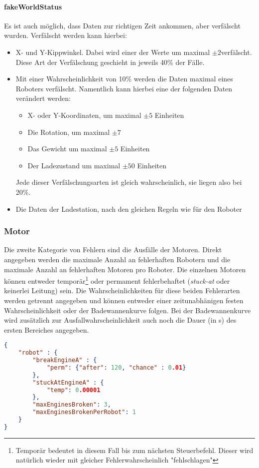\paragraph{fakeWorldStatus} Es ist auch m{\"{o}}glich, dass Daten zur richtigen Zeit ankommen, aber
    verf{\"{a}}lscht wurden. Verf{\"{a}}lscht werden kann hierbei:
	\begin{itemize}
		\item X- und Y-Kippwinkel. Dabei wird einer der Werte um maximal $\pm 2$\textdegree verf{\"{a}}lscht.
			Diese Art der Verf{\"{a}}lschung geschieht in jeweils 40\% der F{\"{a}}lle.
		\item Mit einer Wahrscheinlichkeit von 10\% werden die Daten maximal eines Roboters verf{\"{a}}lscht.
			Namentlich kann hierbei eine der folgenden Daten ver{\"{a}}ndert werden:
			\begin{itemize}
				\item X- oder Y-Koordinaten, um maximal $\pm 5$ Einheiten
				\item Die Rotation, um maximal $\pm 7$\textdegree
				\item Das Gewicht um maximal $\pm 5$ Einheiten
				\item Der Ladezustand um maximal $\pm 50$ Einheiten
			\end{itemize}
			Jede dieser Verf{\"{a}}lschungsarten ist gleich wahrscheinlich, sie liegen also bei 20\%.
		\item Die Daten der Ladestation, nach den gleichen Regeln wie f{\"{u}}r den Roboter
	\end{itemize}

\subsubsection{Motor}
Die zweite Kategorie von Fehlern sind die Ausf{\"{a}}lle der Motoren. Direkt angegeben werden die maximale
Anzahl an fehlerhaften Robotern und die maximale Anzahl an fehlerhaften Motoren pro Roboter.
Die einzelnen Motoren k{\"{o}}nnen entweder tempor{\"{a}}r\footnote{Tempor{\"{a}}r bedeutet
in diesem Fall bis zum n{\"{a}}chsten Steuerbefehl. Dieser wird nat{\"{u}}rlich wieder mit
gleicher Fehlerwahrscheinlich "fehlschlagen"} oder permament fehlerbehaftet (\textit{stuck-at}
oder keinerlei Leitung) sein. Die Wahrscheinlichkeiten f{\"{u}}r diese beiden Fehlerarten werden getrennt
angegeben und k{\"{o}}nnen entweder einer zeitunabh{\"{a}}nigen festen Wahrscheinlichkeit oder der
Badewannenkurve folgen. Bei der Badewannenkurve wird zus{\"{a}}tzlich zur Ausfallwahrscheinlichkeit auch
noch die Dauer (in s) des ersten Bereiches angegeben.
\begin{lstlisting}[frame=single, language=json] 
{
	"robot" : {
		"breakEngineA" : {
			"perm": {"after": 120, "chance" : 0.01}
		},
		"stuckAtEngineA" : {
			"temp": 0.00001
		},
		"maxEnginesBroken": 3,
		"maxEnginesBrokenPerRobot": 1
	}
}
\end{lstlisting}


